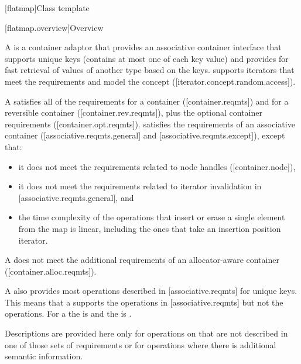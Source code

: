 \noindent\makebox[\linewidth]{\rule{\textwidth}{0.4pt}}

\setcounter{subsection}{7}
\begin{addedblock}
[flatmap]{Class template }

[flatmap.overview]{Overview}

\pnum
{}%
A  is a container adaptor that provides an associative
container interface that supports unique keys (contains at most one of each
key value) and provides for fast retrieval of values of another type 
based on the keys.  supports iterators that meet the
 requirements and model the 
concept ([iterator.concept.random.access]).

\pnum
A  satisfies all of the requirements for a container
([container.reqmts]) and for a reversible container ([container.rev.reqmts]),
plus the optional container requirements ([container.opt.reqmts]).  
satisfies the requirements of an associative container ([associative.reqmts.general] and
[associative.reqmts.except]), except that:
\begin{itemize}
\item it does not meet the requirements related to node handles ([container.node]),
\item it does not meet the requirements related to iterator invalidation in [associative.reqmts.general], and
\item the time complexity of the operations that insert or erase a single
element from the map is linear, including the ones that take an insertion
position iterator.
\end{itemize}
\begin{note}A  does not meet the additional requirements of an
allocator-aware container ([container.alloc.reqmts]).\end{note}

\pnum
A  also provides most operations described
in [associative.reqmts] for unique keys.  This means that a
 supports the  operations
in [associative.reqmts] but not the  operations.  For
a  the  is  and the
 is .

\pnum
Descriptions are provided here only for operations on  that
are not described in one of those sets of requirements or for operations where
there is additional semantic information.


\end{addedblock}
